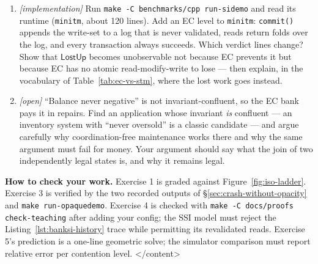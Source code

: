 \begin{enumerate}
\item \emph{[implementation]} Run \texttt{make -C benchmarks/cpp run-sidemo}
and read its runtime (\texttt{minitm}, about 120 lines). Add an EC level
to \texttt{minitm}: \texttt{commit()} appends the write-set to a log that
is never validated, reads return folds over the log, and every transaction
always succeeds. Which verdict lines change? Show that
$\mathsf{LostUp}$ becomes unobservable not because EC prevents it but
because EC has no atomic read-modify-write to lose --- then explain, in the
vocabulary of Table~\ref{tab:ec-vs-stm}, where the lost work goes instead.

\item \emph{[open]} ``Balance never negative'' is not invariant-confluent,
so the EC bank pays it in repairs. Find an application whose invariant
\emph{is} confluent --- an inventory system with ``never oversold'' is a
classic candidate --- and argue carefully why coordination-free maintenance
works there and why the same argument must fail for money. Your argument
should say what the join of two independently legal states is, and why it
remains legal.
\end{enumerate}

\textbf{How to check your work.} Exercise 1 is graded against
Figure~\ref{fig:iso-ladder}. Exercise 3 is verified by the two recorded
outputs of \S\ref{sec:crash-without-opacity} and \texttt{make run-opaquedemo}.
Exercise 4 is checked with \texttt{make -C docs/proofs check-teaching} after
adding your config; the SSI model must reject the Listing~\ref{lst:banksi-history}
trace while permitting its revalidated reads. Exercise 5's prediction is a
one-line geometric solve; the simulator comparison must report relative error
per contention level.
</content>

